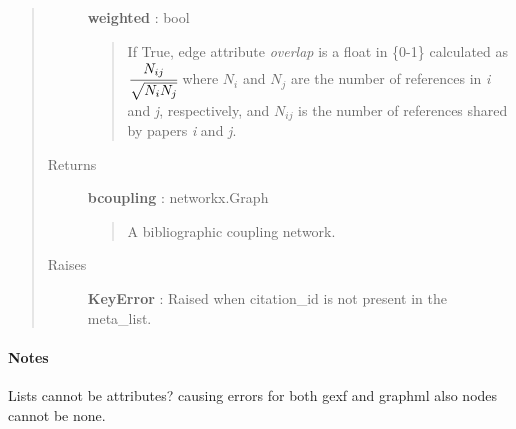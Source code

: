\documentclass[letterpaper,10pt,english]{sphinxmanual}
\begin{document}
\begin{fulllineitems}
\begin{quote}
\begin{description}
\textbf{weighted} : bool
\begin{quote}

If True, edge attribute \emph{overlap} is a float in \{0-1\} calculated as
$\cfrac{N_{ij}}{\sqrt{N_{i}N_{j}}}$ where $N_{i}$ and
$N_{j}$ are the number of references in {\hyperref[tethne:tethne.data.Paper]{}} \emph{i} and
\emph{j}, respectively, and $N_{ij}$ is the number of references
shared by papers \emph{i} and \emph{j}.
\end{quote}

\item[{Returns }] \leavevmode
\textbf{bcoupling} : networkx.Graph
\begin{quote}

A bibliographic coupling network.
\end{quote}

\item[{Raises }] \leavevmode
\textbf{KeyError} : Raised when citation\_id is not present in the meta\_list.

\end{description}\end{quote}
\paragraph{Notes}

Lists cannot be attributes? causing errors for both gexf and graphml also
nodes cannot be none.

\end{fulllineitems}

\end{document}
